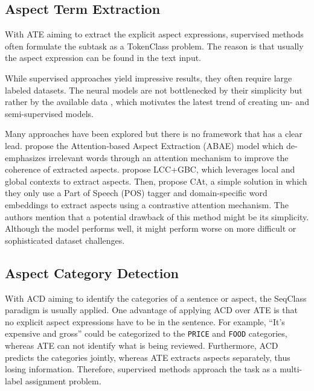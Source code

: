 \documentclass[american, oneside]{ecsgdp}
\begin{document}
\subsection{Aspect Term Extraction} \label{sec:ATE}
With ATE aiming to extract the explicit aspect expressions, supervised methods often formulate the subtask as a TokenClass problem. The reason is that usually the aspect expression can be found in the text input.


While supervised approaches yield impressive results, they often require large labeled datasets. The neural models are not bottlenecked by their simplicity but rather by the available data \parencite{Huang2020JASen}, which motivates the latest trend of creating un- and semi-supervised models.  


Many approaches have been explored but there is no framework that has a clear lead. \textcite{He2017ABAE} propose the Attention-based Aspect Extraction (ABAE) model which de-emphasizes irrelevant words through an attention mechanism to improve the coherence of extracted aspects. \textcite{Liao2019LCC+GBC} propose LCC+GBC, which leverages local and global contexts to extract aspects. Then, \textcite{Tulkens2020CAt} propose CAt, a simple solution in which they only use a Part of Speech (POS) tagger and domain-specific word embeddings to extract aspects using a contrastive attention mechanism. The authors mention that a potential drawback of this method might be its simplicity. Although the model performs well, it might perform worse on more difficult or sophisticated dataset challenges. 


\subsection{Aspect Category Detection} \label{sec:ACD}
With ACD aiming to identify the categories of a sentence or aspect, the SeqClass paradigm is usually applied. One advantage of applying ACD over ATE is that no explicit aspect expressions have to be in the sentence. For example, ``It's expensive and gross'' could be categorized to the \texttt{PRICE} and \texttt{FOOD} categories, whereas ATE can not identify what is being reviewed. Furthermore, ACD predicts the categories jointly, whereas ATE extracts aspects separately, thus losing information. Therefore, supervised methods approach the task as a multi-label assignment problem. 
\end{document}
